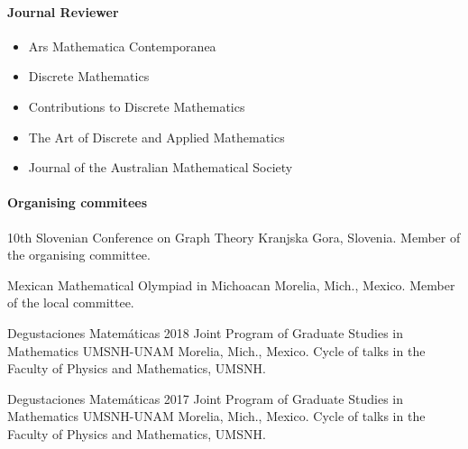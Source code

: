 \paragraph{Journal Reviewer}
  \begin{itemize}
		\item{Ars Mathematica Contemporanea}
		\item{Discrete Mathematics}
		\item{Contributions to Discrete Mathematics}
		\item{The Art of Discrete and Applied Mathematics}
		\item{Journal of the Australian Mathematical Society}
  \end{itemize}

  \paragraph{Organising commitees}\leavevmode

	  {
	  {10th Slovenian Conference on Graph Theory}%
	  }
	  {}
	  {
	  {Kranjska Gora, Slovenia.}%
	  }
	  {}
	  {
	  {Member of the organising committee.}%
	  }

	  {
	  {Mexican Mathematical Olympiad in Michoacan}%
	  }
	  {}
	  {
	  {Morelia, Mich., Mexico.}%
	  }
	  {}
	  {
	  {Member of the local committee.}%
	  }

    {Degustaciones Matemáticas 2018}
    {
    {Joint Program of Graduate Studies in Mathematics UMSNH-UNAM}%
    }
    {
    {Morelia, Mich., Mexico.}%
    }
    {}
    {
    {Cycle of talks in the Faculty of Physics and Mathematics, UMSNH.}%
    }

    {Degustaciones Matemáticas 2017}
    {
    {Joint Program of Graduate Studies in Mathematics UMSNH-UNAM}%
    }
    {
    {Morelia, Mich., Mexico.}%
    }
    {}
    {
    {Cycle of talks in the Faculty of Physics and Mathematics, UMSNH.}%
    }

